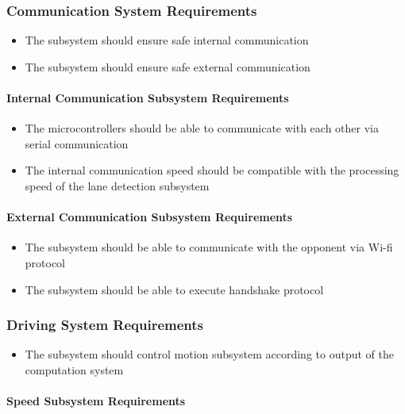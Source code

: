 \documentclass[a4paper,12pt]{article}
\begin{document}
	\subsubsection{Communication System Requirements}
		
		\begin{itemize}
			\item The subsystem should ensure safe internal communication
			\item The subsystem should ensure safe external communication
		\end{itemize}
	
	\paragraph{Internal Communication Subsystem Requirements}

		\begin{itemize}
			\item The microcontrollers should be able to communicate with each other via serial communication
			\item The internal communication speed should be compatible with the processing speed of the lane detection subsystem  
		\end{itemize}
	
	\paragraph{External Communication Subsystem Requirements}	
	
		\begin{itemize}
			\item The subsystem should be able to communicate with the opponent via Wi-fi protocol
			\item The subsystem should be able to execute handshake protocol
		\end{itemize}
	
	
	\subsubsection{Driving System Requirements}
	
		\begin{itemize}
			\item The subsystem should control motion subsystem according to output of the computation system
		\end{itemize}
	
	\paragraph{Speed Subsystem Requirements}	
		
\end{document}
